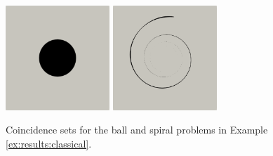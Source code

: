 \documentclass[letterpaper,final,12pt,reqno]{amsart}
\theoremstyle{cstyle}
\theoremstyle{cstyle*}
\theoremstyle{dstyle}
\numberwithin{equation}{section}
\numberwithin{figure}{section}
\numberwithin{table}{section}
\numberwithin{theorem}{section}
\begin{document}
\begin{figure}[ht]
\begin{center}
\includegraphics[width=0.35\textwidth]{fixfigs/ball-set.png} \qquad \includegraphics[width=0.35\textwidth]{fixfigs/spiral-set.png}
\end{center}
\caption{Coincidence sets for the ball and spiral problems in Example \ref{ex:results:classical}.}
\label{fig:results:classical}
\end{figure}
\end{document}
